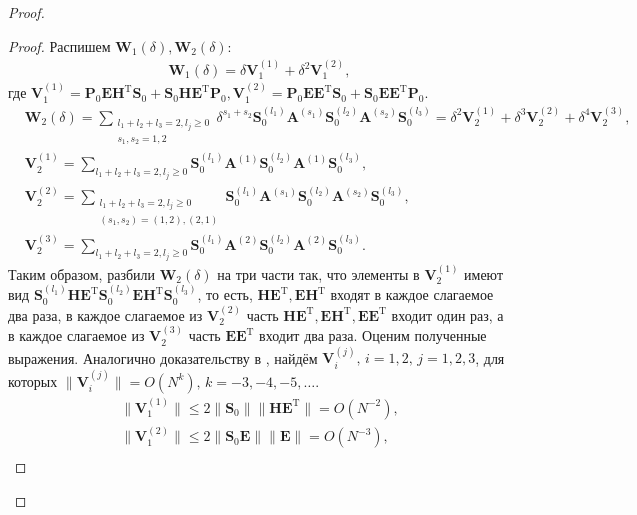\documentclass[specialist,
substylefile = spbu_report.rtx,
subf,href,colorlinks=true, 12pt]{disser}
\begin{document}
\begin{proof}
		\begin{proof}
			Распишем $\mathbf{W}_1(\delta), \mathbf{W}_2(\delta)$:
			\begin{align*}
				\mathbf{W}_1(\delta)=\delta \mathbf{V}_1^{(1)}+\delta^2\mathbf{V}_1^{(2)},
			\end{align*}
			где $\mathbf{V}_1^{(1)}=\mathbf{P}_0\mathbf{EH}^\mathrm{T}\mathbf{S}_0+\mathbf{S}_0\mathbf{HE}^\mathrm{T}\mathbf{P}_0, \mathbf{V}_1^{(2)}=\mathbf{P}_0\mathbf{EE}^\mathrm{T}\mathbf{S}_0+\mathbf{S}_0\mathbf{EE}^\mathrm{T}\mathbf{P}_0$.
			\begin{align*}
				&\mathbf{W}_2(\delta) = \sum_{\substack{l_1+l_2+l_3=2,l_j\geqslant0\\s_1,s_2=1,2}}\delta^{s_1+s_2}\mathbf{S}_0^{(l_1)}\mathbf{A}^{(s_1)}\mathbf{S}_0^{(l_2)}\mathbf{A}^{(s_2)}\mathbf{S}_0^{(l_3)}=\delta^2\mathbf{V}_2^{(1)}+\delta^3\mathbf{V}_2^{(2)}+\delta^4\mathbf{V}_2^{(3)},\\
				&\mathbf{V}_2^{(1)}=\sum_{l_1+l_2+l_3=2,l_j\geqslant0}\mathbf{S}_0^{(l_1)}\mathbf{A}^{(1)}\mathbf{S}_0^{(l_2)}\mathbf{A}^{(1)}\mathbf{S}_0^{(l_3)},\\
				&\mathbf{V}_2^{(2)}=\sum_{\substack{l_1+l_2+l_3=2,l_j\geqslant0\\(s_1,s_2)=(1,2),(2,1)}}\mathbf{S}_0^{(l_1)}\mathbf{A}^{(s_1)}\mathbf{S}_0^{(l_2)}\mathbf{A}^{(s_2)}\mathbf{S}_0^{(l_3)},\\
				&\mathbf{V}_2^{(3)}=\sum_{l_1+l_2+l_3=2,l_j\geqslant0}\mathbf{S}_0^{(l_1)}\mathbf{A}^{(2)}\mathbf{S}_0^{(l_2)}\mathbf{A}^{(2)}\mathbf{S}_0^{(l_3)}.
			\end{align*}
			Таким образом, разбили $\mathbf{W}_2(\delta)$ на три части так, что элементы в $\mathbf{V}_2^{(1)}$ имеют вид $\mathbf{S}_0^{(l_1)}\mathbf{HE}^\mathrm{T}\mathbf{S}_0^{(l_2)}\mathbf{EH}^\mathrm{T}\mathbf{S}_0^{(l_3)}$, то есть, $\mathbf{HE}^\mathrm{T},\mathbf{EH}^\mathrm{T}$ входят в каждое слагаемое два раза, в каждое слагаемое из $\mathbf{V}_2^{(2)}$ часть $\mathbf{HE}^\mathrm{T},\mathbf{EH}^\mathrm{T},\mathbf{EE}^\mathrm{T}$ входит один раз, а в каждое слагаемое из $\mathbf{V}_2^{(3)}$ часть $\mathbf{EE}^\mathrm{T}$ входит два раза. Оценим полученные выражения. Аналогично доказательству в \cite{ZNekrutkin}, найдём $\mathbf{V}_i^{(j)},\, i=1,2,\, j=1,2,3$, для которых $\|\mathbf{V}_i^{(j)}\|=O(N^{k}),\, k=-3,-4,-5,\dots$. 
			\begin{align*}
				\|\mathbf{V}_1^{(1)}\|\leqslant 2\|\mathbf{S}_0\|\|\mathbf{HE}^\mathrm{T}\|=O(N^{-2}),\\
				\|\mathbf{V}_1^{(2)}\|\leqslant 2\|\mathbf{S}_0\mathbf{E}\|\|\mathbf{E}\|=O(N^{-3}),\\

\end{align*}
\end{proof}
\end{proof}
\end{document}
